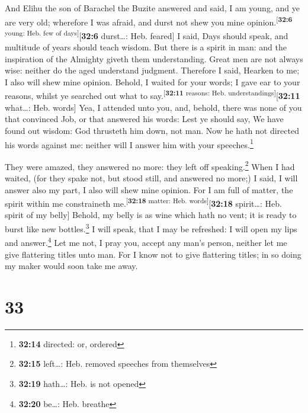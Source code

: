  And Elihu the son of Barachel the Buzite answered and
said, I am young, and ye are very old; wherefore I was afraid, and durst
not shew you mine opinion.\textsuperscript{{[}\textbf{32:6} young: Heb.
few of days{]}}{[}\textbf{32:6} durst\ldots: Heb. feared{]}
 I said, Days should speak, and multitude of years should
teach wisdom.  But there is a spirit in man: and the
inspiration of the Almighty giveth them understanding. 
Great men are not always wise: neither do the aged understand judgment.
 Therefore I said, Hearken to me; I also will shew mine
opinion.  Behold, I waited for your words; I gave ear to
your reasons, whilst ye searched out what to
say.\textsuperscript{{[}\textbf{32:11} reasons: Heb.
understandings{]}}{[}\textbf{32:11} what\ldots: Heb. words{]}
 Yea, I attended unto you, and, behold, there was none of
you that convinced Job, or that answered his words:  Lest
ye should say, We have found out wisdom: God thrusteth him down, not
man.  Now he hath not directed his words against me:
neither will I answer him with your speeches.\footnote{\textbf{32:14}
  directed: or, ordered}

 They were amazed, they answered no more: they left off
speaking.\footnote{\textbf{32:15} left\ldots: Heb. removed speeches from
  themselves}  When I had waited, (for they spake not,
but stood still, and answered no more;)  I said, I will
answer also my part, I also will shew mine opinion.  For
I am full of matter, the spirit within me constraineth
me.\textsuperscript{{[}\textbf{32:18} matter: Heb.
words{]}}{[}\textbf{32:18} spirit\ldots: Heb. spirit of my belly{]}
 Behold, my belly is as wine which hath no vent; it is
ready to burst like new bottles.\footnote{\textbf{32:19} hath\ldots:
  Heb. is not opened}  I will speak, that I may be
refreshed: I will open my lips and answer.\footnote{\textbf{32:20}
  be\ldots: Heb. breathe}  Let me not, I pray you, accept
any man's person, neither let me give flattering titles unto man.
 For I know not to give flattering titles; in so doing my
maker would soon take me away.

\hypertarget{section-32}{%
\section{33}\label{section-32}}

